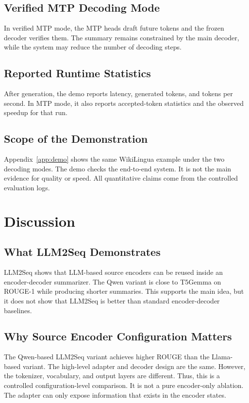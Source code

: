\documentclass[11pt]{article}
\begin{document}
\subsection{Verified MTP Decoding Mode}

In verified MTP mode, the MTP heads draft future tokens and the frozen decoder verifies them.
The summary remains constrained by the main decoder, while the system may reduce the number of decoding steps.

\subsection{Reported Runtime Statistics}

After generation, the demo reports latency, generated tokens, and tokens per second.
In MTP mode, it also reports accepted-token statistics and the observed speedup for that run.

\subsection{Scope of the Demonstration}

Appendix~\ref{app:demo} shows the same WikiLingua example under the two decoding modes.
The demo checks the end-to-end system.
It is not the main evidence for quality or speed.
All quantitative claims come from the controlled evaluation logs.

\section{Discussion}
\label{sec:discussion}

\subsection{What LLM2Seq Demonstrates}

LLM2Seq shows that LLM-based source encoders can be reused inside an encoder-decoder summarizer.
The Qwen variant is close to T5Gemma on ROUGE-1 while producing shorter summaries.
This supports the main idea, but it does not show that LLM2Seq is better than standard encoder-decoder baselines.

\subsection{Why Source Encoder Configuration Matters}

The Qwen-based LLM2Seq variant achieves higher ROUGE than the Llama-based variant.
The high-level adapter and decoder design are the same.
However, the tokenizer, vocabulary, and output layers are different.
Thus, this is a controlled configuration-level comparison.
It is not a pure encoder-only ablation.
The adapter can only expose information that exists in the encoder states.
\end{document}

